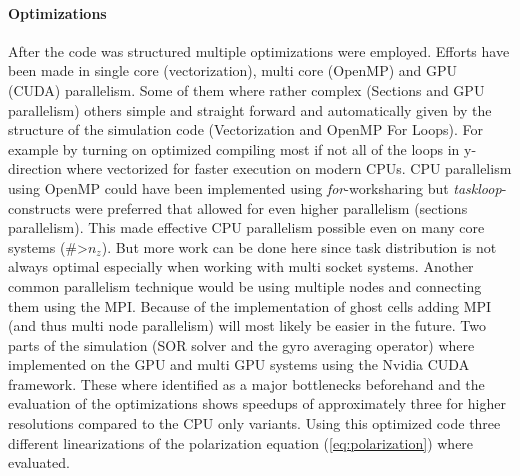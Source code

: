 \documentclass[master.tex]{subfiles}
\begin{document}
\paragraph{Optimizations}
After the code was structured multiple optimizations were employed. Efforts have been made in single core (vectorization), multi core (OpenMP) and GPU (CUDA) parallelism. Some of them where rather complex (Sections and GPU parallelism) others simple and straight forward and automatically given by the structure of the simulation code (Vectorization and OpenMP For Loops). For example by turning on optimized compiling most if not all of the loops in y-direction where vectorized for faster execution on modern CPUs.\newline
CPU parallelism using OpenMP could have been implemented using \textit{for}-worksharing but \textit{taskloop}-constructs were preferred that allowed for even higher parallelism (sections parallelism). This made effective CPU parallelism possible even on many core systems (\#>$n_z$). But more work can be done here since task distribution is not always optimal especially when working with multi socket systems. Another common parallelism technique would be using multiple nodes and connecting them using the \ac{MPI}. Because of the implementation of ghost cells adding \ac{MPI} (and thus multi node parallelism) will most likely be easier in the future.\newline
Two parts of the simulation (\ac{SOR} solver and the gyro averaging operator) where implemented on the GPU and multi GPU systems using the Nvidia CUDA framework. These where identified as a major bottlenecks beforehand and the evaluation of the optimizations shows speedups of approximately three for higher resolutions compared to the CPU only variants. Using this optimized code three different linearizations of the polarization equation (\autoref{eq:polarization}) where evaluated.
\end{document}
